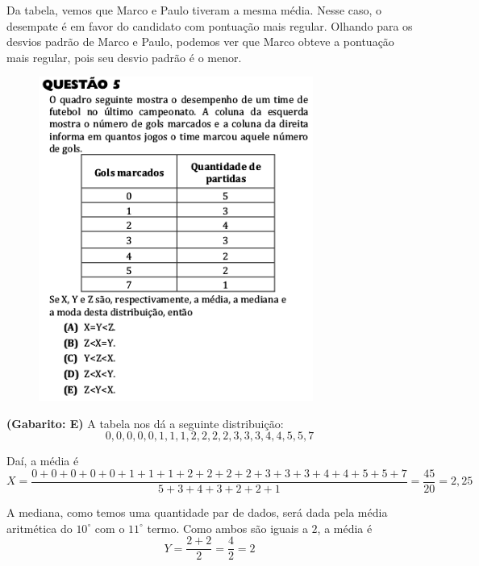 \documentclass[a4paper]{article}
\begin{document}
\par\vspace{0.3cm} Da tabela, vemos que Marco e Paulo tiveram a mesma média. Nesse caso, o desempate é em favor do candidato com pontuação mais regular. Olhando para os desvios padrão de Marco e Paulo, podemos ver que Marco obteve a pontuação mais regular, pois seu desvio padrão é o menor.
\begin{figure}[H]
	\begin{center}
		\includegraphics[width=9cm]{L1Q5.png}
	\end{center}
\end{figure}
\par\textbf{(Gabarito: E)} A tabela nos dá a seguinte distribuição:
\begin{equation*}
0,0,0,0,0,1,1,1,2,2,2,2,3,3,3,4,4,5,5,7
\end{equation*}
\par\vspace{0.3cm} Daí, a média é
\begin{equation*}
X = \frac{0+0+0+0+0+1+1+1+2+2+2+2+3+3+3+4+4+5+5+7}{5+3+4+3+2+2+1} = \frac{45}{20} = 2,25
\end{equation*}
\par\vspace{0.3cm} A mediana, como temos uma quantidade par de dados, será dada pela média aritmética do $10^\circ$ com o $11^\circ$ termo. Como ambos são iguais a $2$, a média é
\begin{equation*}
Y = \frac{2+2}{2} = \frac{4}{2} = 2
\end{equation*}
\end{document}
